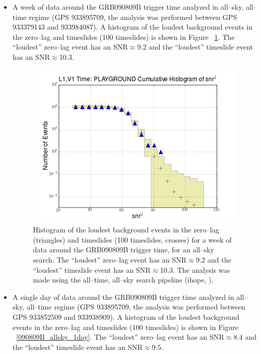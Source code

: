 \begin{itemize}
\item
A week of data around the GRB090809B trigger time analyzed in all--sky, all--time regime (GPS 933895709, the analysis was performed between GPS 933379143 and 933984087). A histogram of the loudest background events in the zero--lag and timeslides (100 timeslides) is shown in Figure ~\ref{090809B_allsky_1week}. The ``loudest'' zero--lag event has an SNR$\approx$9.2 and the ``loudest'' timeslide event has an SNR$\approx$10.3. 

\begin{figure}[ht!]
\centering
\includegraphics[scale=0.55]{Images/090809B_allsky_1week.png}
\caption{Histogram of the loudest background events in the zero--lag (triangles) and timeslides (100 timeslides, crosses) for a week of data around the GRB090809B trigger time, for an all--sky search. The ``loudest'' zero--lag event has an SNR$\approx$9.2 and the ``loudest'' timeslide event has an SNR$\approx$10.3. The analysis was made using the all--time, all--sky search pipeline (ihope, \cite{Abadie:2010yb, Colaboration:2011nz}).}
\label{090809B_allsky_1week}
\end{figure}

\item
A single day of data around the GRB090809B trigger time analyzed in all--sky, all--time regime (GPS 933895709, the analysis was performed between GPS 933852509 and 933938909). A histogram of the loudest background events in the zero--lag and timeslides (100 timeslides) is shown in Figure ~\ref{090809B_allsky_1day}. The ``loudest'' zero--lag event has an SNR$\approx$8.4 and the ``loudest'' timeslide event has an SNR$\approx$9.5.


\end{itemize}
